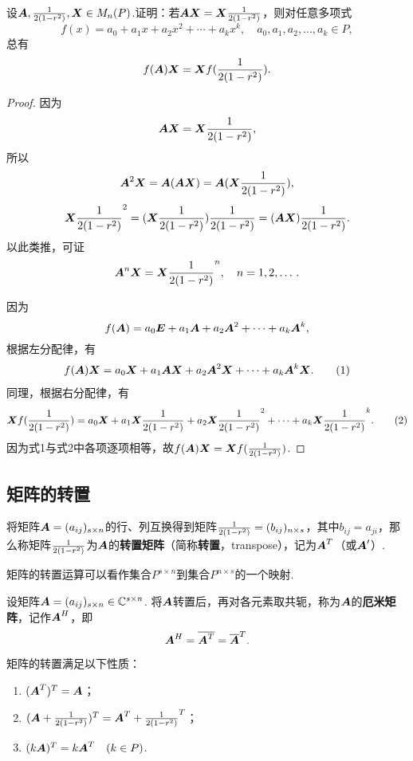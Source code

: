 \begin{example}
设\(\A,\B,\x \in M_n(P)\).证明：若\(\A\x=\x\B\)，则对任意多项式\[
f(x) = a_0 + a_1 x + a_2 x^2 + \dotsb + a_k x^k,
\quad
a_0,a_1,a_2,\dotsc,a_k \in P,
\]总有\[
f(\A) \x = \x f(\B).
\]
\begin{proof}
因为\[
\A\x = \x\B,
\]所以\[
\A^2 \x = \A(\A\x) = \A(\x\B),
\]\[
\x \B^2 = (\x\B)\B = (\A\x)\B.
\]以此类推，可证\[
\A^n \x = \x \B^n,
\quad n=1,2,\dotsc.
\]

因为\[
f(\A) = a_0 \E + a_1 \A + a_2 \A^2 + \dotsb + a_k \A^k,
\]根据左分配律，有\begin{gather}
f(\A) \x = a_0 \x + a_1 \A\x + a_2 \A^2 \x + \dotsb + a_k \A^k \x. \tag1
\end{gather}同理，根据右分配律，有\begin{gather}
\x f(\B) = a_0 \x + a_1 \x\B + a_2 \x \B^2 + \dotsb + a_k \x \B^k. \tag2
\end{gather}
因为式1与式2中各项逐项相等，故\(f(\A) \x = \x f(\B)\).
\end{proof}
\end{example}

\subsection{矩阵的转置}
\begin{definition}[矩阵的转置]
将矩阵\(\A=(a_{ij})_{s \times n}\)的行、列互换得到矩阵\(\B=(b_{ij})_{n \times s}\)，其中\(b_{ij} = a_{ji}\)，那么称矩阵\(\B\)为\(\A\)的\textbf{转置矩阵}（简称\textbf{转置}，transpose），记为\(\A^T\)（或\(\A'\)）.
\end{definition}
矩阵的转置运算可以看作集合\(P^{s \times n}\)到集合\(P^{n \times s}\)的一个映射.

\begin{definition}[厄米矩阵]
\def\a#1{\overline{a_{#1}}}
设矩阵\(\A = (a_{ij})_{s \times n} \in \mathbb{C}^{s \times n}\).
将\(\A\)转置后，再对各元素取共轭，称为\(\A\)的\textbf{厄米矩阵}，记作\(\A^H\)，即\[
\A^H = \overline{\A^T} = \overline{\A}^T.
\]
\end{definition}


\begin{property}
矩阵的转置满足以下性质：
\begin{enumerate}
\item \((\A^T)^T = \A\)；
\item \((\A+\B)^T = \A^T + \B^T\)；
\item \((k\A)^T = k\A^T \quad(k \in P)\).
\end{enumerate}
\end{property}

